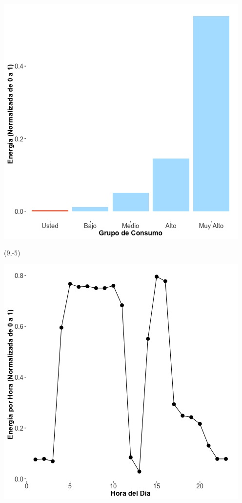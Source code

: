 \documentclass{article}\usepackage[]{graphicx}\usepackage[]{color}
\newenvironment{knitrout}{}{} %
\begin{document}
\begin{knitrout}
\color{fgcolor}
\includegraphics[scale=0.65]{figure/A14_neighbor_plot} 
\end{knitrout}

 \begin{textblock}{1}(9,-5)
\begin{minipage}{20em}
\begingroup

\endgroup
\end{minipage}
\end{textblock}


\begin{knitrout}
\color{fgcolor}
\includegraphics[scale=0.65]{figure/A14_plot_norm_median} 
\end{knitrout}
\end{document}
